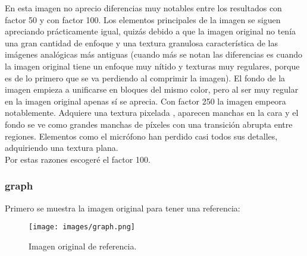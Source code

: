 \documentclass[12pt,a4paper]{article}
\begin{document}
En esta imagen no aprecio diferencias muy notables entre los resultados con factor 50 y con factor 100. Los elementos principales de la imagen se siguen apreciando prácticamente igual, quizás debido a que la imagen original no tenía una gran cantidad de enfoque y una textura granulosa característica de las imágenes analógicas más antiguas (cuando más se notan las diferencias es cuando la imagen original tiene un enfoque muy nítido y texturas muy regulares, porque es de lo primero que se va perdiendo al comprimir la imagen). El fondo de la imagen empieza a unificarse en bloques del mismo color, pero al ser muy regular en la imagen original apenas sí se aprecia. Con factor 250 la imagen empeora notablemente. Adquiere una textura pixelada , aparecen manchas en la cara y el fondo se ve como grandes manchas de píxeles con una transición abrupta entre regiones. Elementos como el micrófono han perdido casi todos sus detalles, adquiriendo una textura plana.\\

Por estas razones escogeré el factor 100.




\subsubsection{graph}
Primero se muestra la imagen original para tener una referencia:
\begin{figure}[H]
    \centering
    \texttt{[image: images/graph.png]}
    \caption[Referencia - graph]{Imagen original de referencia.}
    
\end{figure}
    \vspace{0.5cm}
    
\end{document}
